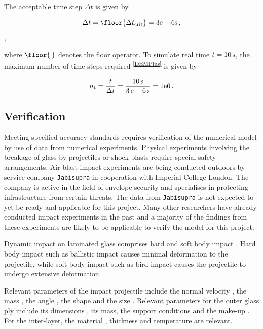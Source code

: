 The acceptable time step $\Delta t$ is given by

\begin{equation}
    \label{eq:deltat}
    \Delta t= \floor{\Delta t_{\rm{crit}}} = 3\rm{e}-6{\rm{s}}\,,
\end{equation},

where $\floor{\,}$ denotes the floor operator. To simulate real time $t=10\,{\rm{s}}$, the maximum number of time steps required \cite{Far19}\textsuperscript{\ref{DEMPlus}} is given by

\begin{equation}
    \label{eq:nt}
    n_{\rm{t}}=\frac{t}{\Delta t}=\frac{10\,{\rm{s}}}{3\,{\rm{e}}-6\,{\rm{s}}}=1{\rm{e}}6\,.
\end{equation}


\subsection{Verification}
\label{subsec:Verification}

Meeting specified accuracy standards \cite{Sto15} requires verification of the numerical model by use of data from numerical experiments. Physical experiments involving the breakage of glass by projectiles or shock blasts require special safety arrangements. Air blast impact experiments are being conducted outdoors by service company \texttt{Jabisupra} \cite{Jab16} in cooperation with Imperial College London. The company is active in the field of envelope security and specialises in protecting infrastructure from certain threats. The data from \texttt{Jabisupra} is not expected to yet be ready and applicable for this project. Many other researchers have already conducted impact experiments in the past and a majority of the findings from these experiments are likely to be applicable to verify the model for this project.

\bigbreak
Dynamic impact on laminated glass comprises hard and soft body impact \cite{Moh17}. Hard body impact such as ballistic impact \cite{Bra10} causes minimal deformation to the projectile, while soft body impact such as bird impact \cite{Moh17} causes the projectile to undergo extensive deformation.

\bigbreak
Relevant parameters of the impact projectile include the normal velocity \cite{Gra98, Kar14, Dar13, Wu14}, the mass \cite{Kar14, Dar13}, the angle \cite{Gra98, Kar14, Dar13}, the shape \cite{Dar13} and the size \cite{Wu14}. Relevant parameters for the outer glass ply include its dimensions \cite{Wan18}, its mass, the support conditions \cite{Wan18} and the make-up \cite{Wan18}. For the inter-layer, the material \cite{Moh18, Wan18, Mon04}, thickness \cite{Ji98, Kar14, Wan18} and temperature \cite{Moh18, Zha19} are relevant.

